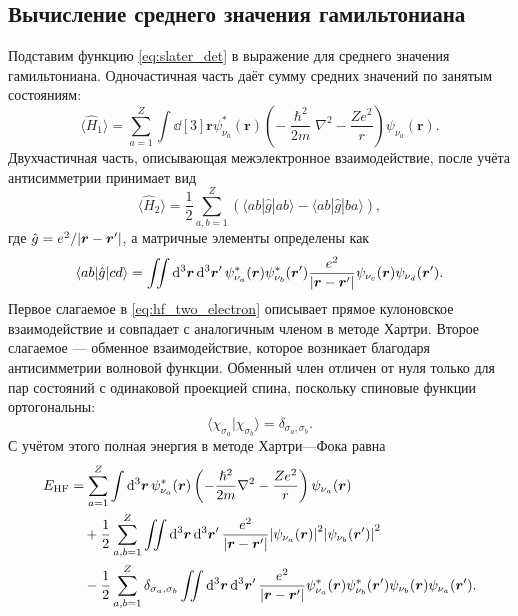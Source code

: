 \documentclass[a4paper, 12pt]{article}
\numberwithin{equation}{section}
\begin{document}
\subsection{Вычисление среднего значения гамильтониана}
\label{subsec:hf_energy_calculation}

Подставим функцию \eqref{eq:slater_det} в выражение для среднего значения гамильтониана. Одночастичная часть даёт сумму средних значений по занятым состояниям:
\begin{equation}
\label{eq:hf_one_electron}
\langle \hat{H}_1 \rangle = \sum_{a=1}^{Z} \int \dd[3]{\bm{r}} \psi_{\nu_a}^*(\bm{r}) \left( -\frac{\hslash^2}{2m} \nabla^2 - \frac{Z e^2}{r} \right) \psi_{\nu_a}(\bm{r}).
\end{equation}
Двухчастичная часть, описывающая межэлектронное взаимодействие, после учёта антисимметрии принимает вид
\begin{equation}
\label{eq:hf_two_electron}
\langle \hat{H}_2 \rangle = \frac{1}{2} \sum_{a,b=1}^{Z} \left( \langle a b | \hat{g} | a b \rangle - \langle a b | \hat{g} | b a \rangle \right),
\end{equation}
где $\hat{g} = e^2/\abs{\bm{r} - \bm{r}'}$, а матричные элементы определены как
\begin{equation}
\label{eq:matrix_elements}
\langle a b | \hat{g} | c d \rangle = \iint \dd[3]{\bm{r}} \dd[3]{\bm{r}'} \psi_{\nu_a}^*(\bm{r}) \psi_{\nu_b}^*(\bm{r}') \frac{e^2}{\abs{\bm{r} - \bm{r}'}} \psi_{\nu_c}(\bm{r}) \psi_{\nu_d}(\bm{r}').
\end{equation}
Первое слагаемое в \eqref{eq:hf_two_electron} описывает прямое кулоновское взаимодействие и совпадает с аналогичным членом в методе Хартри. Второе слагаемое --- обменное взаимодействие, которое возникает благодаря антисимметрии волновой функции. Обменный член отличен от нуля только для пар состояний с одинаковой проекцией спина, поскольку спиновые функции ортогональны:
\begin{equation}
\label{eq:spin_orthogonality}
\langle \chi_{\sigma_a} | \chi_{\sigma_b} \rangle = \delta_{\sigma_a, \sigma_b}.
\end{equation}
С учётом этого полная энергия в методе Хартри---Фока равна
\begin{equation}
\label{eq:hf_energy}
\begin{split}
E_{\text{HF}} &= \sum_{a=1}^{Z} \int \dd[3]{\bm{r}} \psi_{\nu_a}^*(\bm{r}) \left( -\frac{\hslash^2}{2m} \nabla^2 - \frac{Z e^2}{r} \right) \psi_{\nu_a}(\bm{r}) \\
&\quad + \frac{1}{2} \sum_{a,b=1}^{Z} \iint \dd[3]{\bm{r}} \dd[3]{\bm{r}'} \frac{e^2}{\abs{\bm{r} - \bm{r}'}} \abs{\psi_{\nu_a}(\bm{r})}^2 \abs{\psi_{\nu_b}(\bm{r}')}^2 \\
&\quad - \frac{1}{2} \sum_{a,b=1}^{Z} \delta_{\sigma_a, \sigma_b} \iint \dd[3]{\bm{r}} \dd[3]{\bm{r}'} \frac{e^2}{\abs{\bm{r} - \bm{r}'}} \psi_{\nu_a}^*(\bm{r}) \psi_{\nu_b}^*(\bm{r}') \psi_{\nu_b}(\bm{r}) \psi_{\nu_a}(\bm{r}').
\end{split}
\end{equation}
\end{document}
